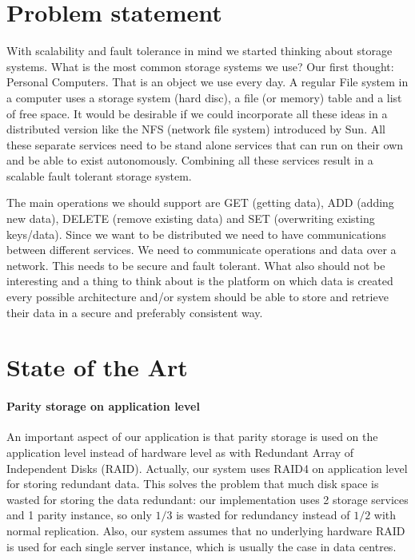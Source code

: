 \documentclass[12pt,a4paper]{scrartcl}
\begin{document}

\section{Problem statement}
With scalability and fault tolerance in mind we started thinking about storage systems. What is the most common storage systems we use? Our first thought: Personal Computers. That is an object we use every day. A regular File system in a computer uses a storage system (hard disc), a file (or memory) table and a list of free space. It would be desirable if we could incorporate all these ideas in a distributed version like the NFS (network file system) introduced by Sun. All these separate services need to be stand alone services that can run on their own and be able to exist autonomously. Combining all these services result in a scalable fault tolerant storage system.

The main operations we should support are GET (getting data), ADD (adding new data), DELETE (remove existing data) and SET (overwriting existing keys/data). Since we want to be distributed we need to have communications between different services. We need to communicate operations and data over a network. This needs to be secure and fault tolerant. What also should not be interesting and a thing to think about is the platform on which data is created every possible architecture and/or system should be able to store and retrieve their data in a secure and preferably consistent way.


\section{State of the Art}
\label{sec:state-of-the-art}

\paragraph{Parity storage on application level}
An important aspect of our application is that parity storage is used on the application level instead of hardware level as with Redundant Array of Independent Disks (RAID). Actually, our system uses RAID4 on application level for storing redundant data. This solves the problem that much disk space is wasted for storing the data redundant: our implementation uses 2 storage services and 1 parity instance, so only $1/3$ is wasted for redundancy instead of $1/2$ with normal replication. Also, our system assumes that no underlying hardware RAID is used for each single server instance, which is usually the case in data centres.
\end{document}

